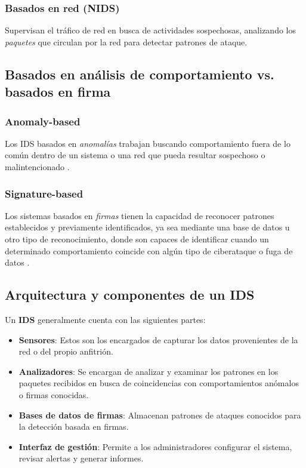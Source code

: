 \documentclass[11pt,a4paper,twoside]{report}
\begin{document}
\subsubsection{Basados en red (NIDS)}

Supervisan el tráfico de red en busca de actividades sospechosas, analizando los \textit{paquetes} que circulan por la red para detectar patrones de ataque.

\subsection{Basados en análisis de comportamiento vs. basados en firma}

\subsubsection{Anomaly-based}

Los IDS basados en \textit{anomalías} trabajan buscando comportamiento fuera de lo común dentro de un sistema o una red que pueda resultar sospechoso o malintencionado \cite{garcia2009anomaly}.

\subsubsection{Signature-based}

Los sistemas basados en \textit{firmas} tienen la capacidad de reconocer patrones establecidos y previamente identificados, ya sea mediante una base de datos u otro tipo de reconocimiento, donde son capaces de identificar cuando un determinado comportamiento coincide con algún tipo de ciberataque o fuga de datos \cite{detection2005signature}.

\subsection{Arquitectura y componentes de un IDS}

Un \textbf{IDS} generalmente cuenta con las siguientes partes:

\begin{itemize}
	\item \textbf{Sensores}: Estos son los encargados de capturar los datos provenientes de la red o del propio anfitrión.
	
	\item \textbf{Analizadores}: Se encargan de analizar y examinar los patrones en los paquetes recibidos en busca de coincidencias con comportamientos anómalos o firmas conocidas.
	
	\item \textbf{Bases de datos de firmas}: Almacenan patrones de ataques conocidos para la detección basada en firmas.
	
	\item \textbf{Interfaz de gestión}: Permite a los administradores configurar el sistema, revisar alertas y generar informes.
\end{itemize}
\end{document}
